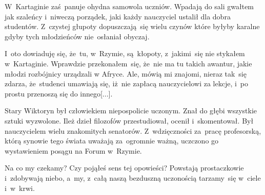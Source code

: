 \documentclass[a4paper,11pt]{article}
\begin{document}

\vspace{\spaceThree}



\noindent
W~Kartaginie zaś~panuje ohydna samowola uczniów. Wpadają do sali
gwałtem jak szaleńcy i~niweczą porządek, jaki każdy nauczyciel ustalił
dla dobra studentów. Z~czystej głupoty dopuszczają~się wielu czynów
które byłyby karalne gdyby tych młodzieńców nie~osłaniał obyczaj.


\vspace{\spaceThree}



\noindent
I~oto dowiaduję się, że~tu, w~Rzymie, są~kłopoty, z~jakimi~się
nie stykałem w~Kartaginie. Wprawdzie przekonałem~się, że~nie ma tu
takich awantur, jakie młodzi rozbójnicy urządzali w Afryce. Ale, mówią
mi znajomi, nieraz tak~się zdarza, że~studenci umawiają się, iż~nie
zapłacą nauczycielowi za lekcje, i~po prostu przenoszą się do
innego[...].


\vspace{\spaceThree}



\noindent
Stary Wiktoryn był człowiekiem niepospolicie uczonym. Znał do
głębi wszystkie sztuki wyzwolone. Ileż dzieł filozofów przestudiował,
ocenił i~skomentował. Był nauczycielem wielu znakomitych
senatorów. Z~wdzięczności za~pracę profesorską, którą synowie tego
świata uważają za~ogromnie ważną, uczczono go wystawieniem posągu na
Forum w~Rzymie.


\vspace{\spaceThree}



\noindent
Na co my czekamy? Czy pojąłeś sens tej opowieści? Powstają
prostaczkowie i~zdobywają niebo, a~my, z~całą naszą bezduszną
uczonością tarzamy~się w~ciele i~w~krwi.

\end{document}
